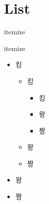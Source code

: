 \documentclass[10pt,blue,xcolor=pdftex,dvipsnames,table,handout]{beamer}
\begin{document}
		\section{List}

		\begin{frame}[plain]
		\centering
		\end{frame}


		\begin{frame}[t]{itemize}

			\begin{block} {itemize}
				\begin{itemize}
				\item 킹
						\begin{itemize}
						\item 킹
								\begin{itemize}
								\item 킹
								\item 왕
								\item 짱
								\end{itemize}
						\item 왕
						\item 짱
						\end{itemize}
				\item 왕
				\item 짱
				\end{itemize}
			\end{block}

		\end{frame}
\end{document}
